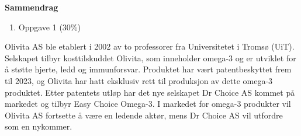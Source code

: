\documentclass[
  12pt,
  a4paper,
  DIV=11,
  numbers=noendperiod]{scrartcl}
\providecommand{\tightlist}{%
  \setlength{\itemsep}{0pt}\setlength{\parskip}{0pt}}\usepackage{longtable,booktabs,array}
\renewcommand*\contentsname{Table of contents}
\newcommand\contentsname{Table of contents}
\begin{document}







\thispagestyle{plain}
\begin{center}
    \Large
    \textbf{Sammendrag}
\end{center}



\newpage
\hypersetup{linkcolor=black}
\renewcommand{\contentsname}{Innholdsfortegnelse}
\renewcommand*{\figureautorefname}{Figur}
\renewcommand*{\tableautorefname}{Tabell}
\tableofcontents
\newpage
\listoffigures
\listoftables
\hypersetup{linkcolor=blue}
\newpage

\begin{enumerate}
\def\labelenumi{\arabic{enumi}.}
\tightlist
\item
  Oppgave 1 (30\%)
\end{enumerate}

Olivita AS ble etablert i 2002 av to professorer fra Universitetet i
Tromsø (UiT). Selskapet tilbyr kosttilskuddet Olivita, som inneholder
omega-3 og er utviklet for å støtte hjerte, ledd og immunforsvar.
Produktet har vært patentbeskyttet frem til 2023, og Olivita har hatt
eksklusiv rett til produksjon av dette omega-3 produktet. Etter
patentets utløp har det nye selskapet Dr Choice AS kommet på markedet og
tilbyr Easy Choice Omega-3. I markedet for omega-3 produkter vil Olivita
AS fortsette å være en ledende aktør, mens Dr Choice AS vil utfordre som
en nykommer.
\end{document}
